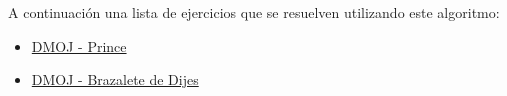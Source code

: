 A continuación una lista de ejercicios que se resuelven utilizando este algoritmo:

\begin{itemize}
	\item \href{https://dmoj.uclv.edu.cu/problem/prince}{DMOJ - Prince}
	\item \href{https://dmoj.uclv.edu.cu/problem/charm}{DMOJ - Brazalete de Dijes}
\end{itemize}